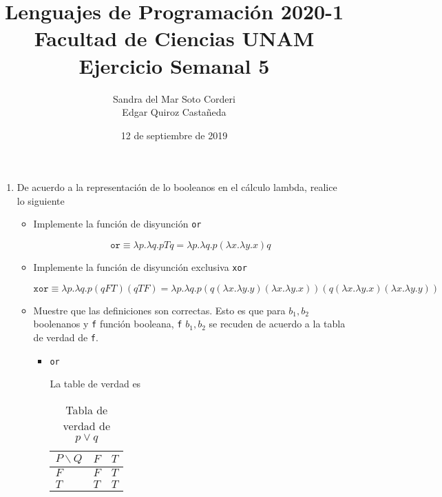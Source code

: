 \documentclass{article}
\title{
    Lenguajes de Programación 2020-1 \\
    Facultad de Ciencias UNAM \\
    Ejercicio Semanal 5
}
\author{
    Sandra del Mar Soto Corderi \\
    Edgar Quiroz Castañeda
}
\date{
    12 de septiembre de 2019
}
\begin{document}
    \maketitle
    \begin{enumerate}
        \item {
            De acuerdo a la representación de lo booleanos en el cálculo lambda,
            realice lo siguiente
            \begin{itemize}
                \item {
                    Implemente la función de disyunción \texttt{or}

                    \[
                        \texttt{or} \equiv 
                        \lambda p. \lambda q. p T q
                        = \lambda p. \lambda q. p (\lambda x. \lambda y. x) q 
                    \]
                }
                \item {
                    Implemente la función de disyunción exclusiva \texttt{xor}

                    \[
                        \texttt{xor} \equiv 
                        \lambda p. \lambda q. p (q F T) (q T F)
                        = \lambda p. \lambda q. p 
                        (q (\lambda x. \lambda y. y) (\lambda x. \lambda y. x)) 
                        (q (\lambda x. \lambda y. x) (\lambda x. \lambda y. y))
                    \]
                }
                \item {
                    Muestre que las definiciones son correctas. Esto es que para
                    $b_1, b_2$ boolenanos y \texttt{f} función booleana,
                    \texttt{f} $b_1, b_2$ se recuden de acuerdo a la tabla de
                    verdad de \texttt{f}.
                    \begin{itemize}
                        \item {
                            \texttt{or}

                            La table de verdad es 

                            \begin{table}[H]
                                \centering
                                \begin{tabular}{|l|l|l|}
                                    \hline
                                    $P \backslash Q$ & $F$ & $T$ \\ \hline
                                    $F$              & $F$ & $T$ \\ \hline
                                    $T$              & $T$ & $T$ \\ \hline
                                \end{tabular}
                                \caption{Tabla de verdad de $p \lor q$}
                                \label{tab:truth_or}
                            \end{table}

}
\end{itemize}}
\end{itemize}}
\end{enumerate}
\end{document}
